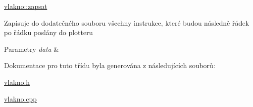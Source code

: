 \hyperlink{classvlakno_ab8e99f38af287397d9ef196a15e3e9e2}{vlakno\+::zapsat} 

Zapisuje do dodatečného souboru všechny instrukce, které budou následně řádek po řádku poslány do plotteru 
\begin{DoxyParams}{Parametry}
{\em data} & \\
\hline
\end{DoxyParams}


Dokumentace pro tuto třídu byla generována z následujících souborů\+:\begin{DoxyCompactItemize}
\item 
\hyperlink{vlakno_8h}{vlakno.\+h}\item 
\hyperlink{vlakno_8cpp}{vlakno.\+cpp}\end{DoxyCompactItemize}
